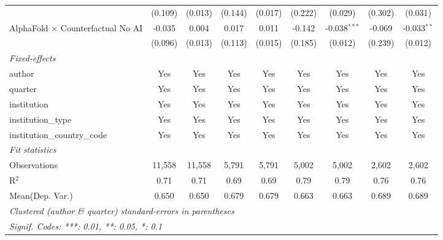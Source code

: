 \begin{tabular}{lcccccccc}
                                            & (0.109) & (0.013) & (0.144) & (0.017) & (0.222) & (0.029)        & (0.302) & (0.031)\\   
   AlphaFold $\times$ Counterfactual No AI  & -0.035  & 0.004   & 0.017   & 0.011   & -0.142  & -0.038$^{***}$ & -0.069  & -0.033$^{**}$\\   
                                            & (0.096) & (0.013) & (0.113) & (0.015) & (0.185) & (0.012)        & (0.239) & (0.012)\\   
   \midrule
   \emph{Fixed-effects}\\
   author                                   & Yes     & Yes     & Yes     & Yes     & Yes     & Yes            & Yes     & Yes\\  
   quarter                                  & Yes     & Yes     & Yes     & Yes     & Yes     & Yes            & Yes     & Yes\\  
   institution                              & Yes     & Yes     & Yes     & Yes     & Yes     & Yes            & Yes     & Yes\\  
   institution\_type                        & Yes     & Yes     & Yes     & Yes     & Yes     & Yes            & Yes     & Yes\\  
   institution\_country\_code               & Yes     & Yes     & Yes     & Yes     & Yes     & Yes            & Yes     & Yes\\  
   \midrule
   \emph{Fit statistics}\\
   Observations                             & 11,558  & 11,558  & 5,791   & 5,791   & 5,002   & 5,002          & 2,602   & 2,602\\  
   R$^2$                                    & 0.71    & 0.71    & 0.69    & 0.69    & 0.79    & 0.79           & 0.76    & 0.76\\  
Mean(Dep. Var.) & 0.650 & 0.650 & 0.679 & 0.679 & 0.663 & 0.663 & 0.689 & 0.689 \\
   \midrule \midrule
   \multicolumn{9}{l}{\emph{Clustered (author \& quarter) standard-errors in parentheses}}\\
   \multicolumn{9}{l}{\emph{Signif. Codes: ***: 0.01, **: 0.05, *: 0.1}}\\
\end{tabular}
\par\endgroup
